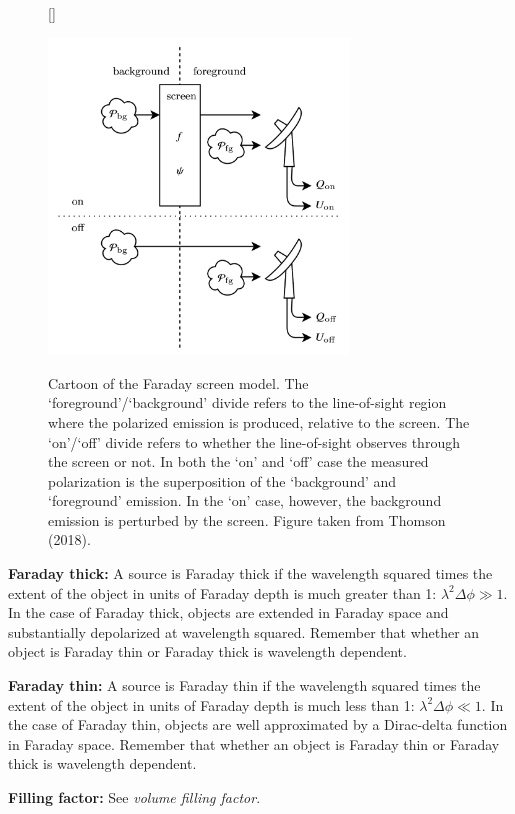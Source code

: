 \documentclass[a4paper,10pt]{article}
\begin{document}
\begin{figure}[h]
    [\FBwidth]
    {\caption{\footnotesize{Cartoon of the Faraday screen model. The `foreground'/`background' divide refers to the line-of-sight region where the polarized emission is produced, relative to the screen. The `on'/`off' divide refers to whether the line-of-sight observes through the screen or not. In both the `on' and `off' case the measured polarization is the superposition of the `background' and `foreground' emission. In the `on' case, however, the background emission is perturbed by the screen. Figure taken from Thomson (2018).}}
    \label{fig:faradayscreenmodel}}
    {\includegraphics[width=8cm]{figures/FaradayScreenModel.png}}
\end{figure}

{\noindent}\textbf{Faraday thick:} A source is Faraday thick if the wavelength squared times the extent of the object in units of Faraday depth is much greater than 1: $\lambda^2\Delta\phi\gg1$. In the case of Faraday thick, objects are extended in Faraday space and substantially depolarized at wavelength squared. Remember that whether an object is Faraday thin or Faraday thick is wavelength dependent.

{\noindent}\textbf{Faraday thin:} A source is Faraday thin if the wavelength squared times the extent of the object in units of Faraday depth is much less than 1: $\lambda^2\Delta\phi\ll1$. In the case of Faraday thin, objects are well approximated by a Dirac-delta function in Faraday space. Remember that whether an object is Faraday thin or Faraday thick is wavelength dependent.

{\noindent}\textbf{Filling factor:} See \textit{volume filling factor}.
\end{document}

